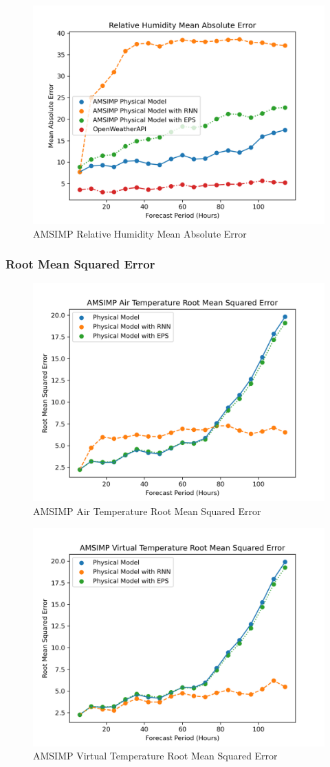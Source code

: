 \begin{appendices}
    \begin{figure}[H]
        \centering
        \includegraphics[width=.7\linewidth]{Graphs/accuracy/appendices/amsimp/relative_humidity/mean_absolute_error.png}
        \caption{AMSIMP Relative Humidity Mean Absolute Error}
    \end{figure}
    
    \subsubsection{Root Mean Squared Error}
    \begin{figure}[H]
        \centering
        \includegraphics[width=.7\linewidth]{Graphs/accuracy/appendices/amsimp/temperature/root_mean_squared_error.png}
        \caption{AMSIMP Air Temperature Root Mean Squared Error}
    \end{figure}
    
    \begin{figure}[H]
        \centering
        \includegraphics[width=.7\linewidth]{Graphs/accuracy/appendices/amsimp/virtual_temperature/root_mean_squared_error.png}
        \caption{AMSIMP Virtual Temperature Root Mean Squared Error}
    \end{figure}
    

\end{appendices}
